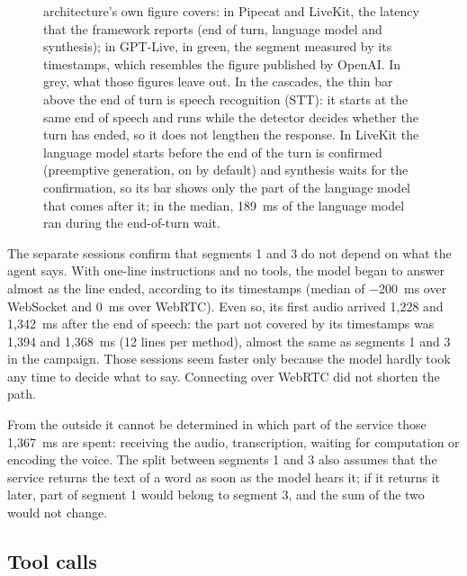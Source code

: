 \documentclass[11pt]{article}
\newcommand{\RRelojServicioMed}{1{,}367}
\newcommand{\RTramoTraslapeMedB}{189}
\newcommand{\RViaRtcFueraMed}{1{,}368}
\newcommand{\RViaRtcMed}{1{,}342}
\newcommand{\RViaRtcModeloMed}{0}
\newcommand{\RViaWsFueraMed}{1{,}394}
\newcommand{\RViaWsMed}{1{,}228}
\newcommand{\RViaWsModeloMed}{$-$200}
\newcommand{\RViaWsN}{12}
\begin{document}
\begin{figure}[htbp]
{architecture's own figure covers: in Pipecat and LiveKit, the latency that the framework
reports (end of turn, language model and synthesis); in GPT-Live, in green, the segment
measured by its timestamps, which resembles the figure published by OpenAI. In grey,
what those figures leave out. In the cascades, the thin bar above the end of turn is
speech recognition (STT): it starts at the same end of speech and runs while the
detector decides whether the turn has ended, so it does not lengthen the response.
In LiveKit the language model starts before the end of
the turn is confirmed (preemptive generation, on by default) and synthesis waits for
the confirmation, so its bar shows only the part of the language model that comes
after it; in the median, \RTramoTraslapeMedB~ms of the language model ran during the
end-of-turn wait.}\label{fig:reloj}
\end{figure}

The separate sessions confirm that segments 1 and 3 do not depend on what the agent
says. With one-line instructions and no tools, the model began to answer almost as the
line ended, according to its timestamps (median of \RViaWsModeloMed~ms over WebSocket
and \RViaRtcModeloMed~ms over WebRTC). Even so, its first audio arrived \RViaWsMed{}
and \RViaRtcMed~ms after the end of speech: the part not covered by its timestamps was
\RViaWsFueraMed{} and \RViaRtcFueraMed~ms (\RViaWsN{} lines per method), almost the
same as segments 1 and 3 in the campaign. Those sessions seem faster only because the
model hardly took any time to decide what to say. Connecting over WebRTC did not
shorten the path.

From the outside it cannot be determined in which part of the service those
\RRelojServicioMed~ms are spent: receiving the audio, transcription, waiting for
computation or encoding the voice. The split between segments 1 and 3 also assumes
that the service returns the text of a word as soon as the model hears it; if it
returns it later, part of segment 1 would belong to segment 3, and the sum of the two
would not change.

\subsection{Tool calls}\label{sec:res-herr}
\end{document}
